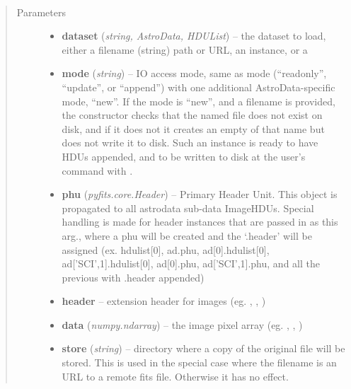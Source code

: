 \documentclass[letterpaper,10pt,english]{sphinxmanual}
\begin{document}
\begin{fulllineitems}
\label{chapter_AstroDataClass:astrodata.data.AstroData.__init__}~\begin{quote}\begin{description}
\item[{Parameters}] \leavevmode\begin{itemize}
\item {} 
\textbf{dataset} (\emph{string, AstroData, HDUList}) -- the dataset to load, either a filename (string) path
or URL, an
 instance, or a 

\item {} 
\textbf{mode} (\emph{string}) -- IO access mode, same as  mode (``readonly'', ``update'',
or ``append'') with one additional AstroData-specific mode, ``new''.
If the mode is ``new'', and a filename is provided, the constructor
checks that the named file does not exist on disk,
and if it does not it creates an empty  of that name 
but does not write it to disk. Such an  
instance is ready to have HDUs appended, and to be written to disk
at the user's command with .

\item {} 
\textbf{phu} (\emph{pyfits.core.Header}) -- Primary Header Unit. This object is propagated to all 
astrodata sub-data ImageHDUs. Special handling is made for header
instances that are passed in as this arg., where a phu will be 
created and the `.header' will be assigned (ex. hdulist{[}0{]}, ad.phu,
ad{[}0{]}.hdulist{[}0{]}, ad{[}'SCI',1{]}.hdulist{[}0{]}, ad{[}0{]}.phu, 
ad{[}'SCI',1{]}.phu, and all the previous with .header appended)

\item {} 
\textbf{header} -- extension header for images (eg. ,
, )

\item {} 
\textbf{data} (\emph{numpy.ndarray}) -- the image pixel array (eg. ,
, )

\item {} 
\textbf{store} (\emph{string}) -- directory where a copy of the original file will be 
stored.  This is used in the special case where the
filename is an URL to a remote fits file.  Otherwise it has
no effect.


\end{itemize}
\end{description}
\end{quote}
\end{fulllineitems}
\end{document}
